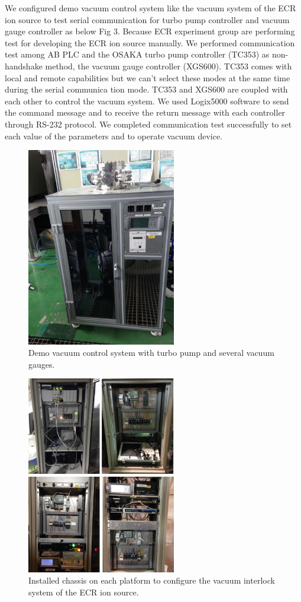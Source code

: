 \documentclass[a4paper,
              ]{jacow}
\begin{document}
We configured demo vacuum control system like the vacuum system of the ECR ion source to test serial communication for turbo pump controller and vacuum gauge controller as below Fig 3. Because ECR experiment group are performing test for developing the ECR ion source manually. 
We performed communication test among AB PLC and the OSAKA turbo pump controller (TC353) as non-handshake method, the vacuum gauge controller (XGS600). TC353 comes with local and remote capabilities but we can’t select these modes at the same time during the serial communica tion mode. TC353 and XGS600 are coupled with each other to control the vacuum system. We used Logix5000 software to send the command message and to receive the return message with each controller through RS-232 protocol. We completed communication test successfully to set each value of the parameters and to operate vacuum device.  

\begin{figure}[!htb]
   \centering
   \includegraphics*[width=65mm]{vacuum_test}
   \caption{Demo vacuum control system with turbo pump and several vacuum gauges.}
   \label{l2ea4-f1}
\end{figure}

\begin{figure}[!htb]
	\centering
	\includegraphics*[width=65mm]{install_total}
	\caption{Installed chassis on each platform to configure the vacuum interlock system of the ECR ion source.}
	\label{l2ea4-f1}
\end{figure}
\end{document}
